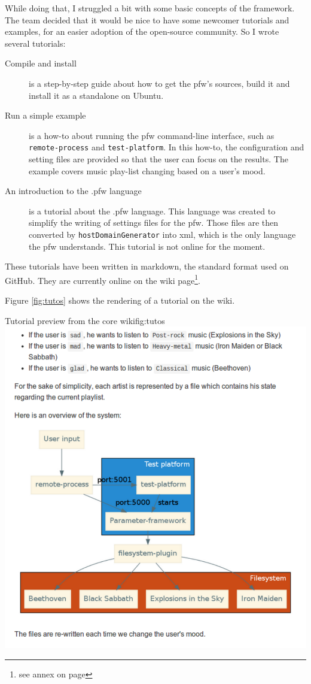 While doing that, I struggled a bit with some basic concepts of the framework. The
team decided that it would be nice to have some newcomer tutorials and examples,
for an easier adoption of the open-source community. So I wrote several
tutorials:
\begin{description}
    \item[Compile and install]
        is a step-by-step guide about how to get the \gls{pfw}'s sources,
        build it and install it as a standalone on Ubuntu.
    \item[Run a simple example]
        is a how-to about running the \gls{pfw} command-line interface,
        such as \lstinline{remote-process} and \lstinline {test-platform}.  In
        this how-to, the configuration and setting files are provided so that
        the user can focus on the results. The example covers music play-list
        changing based on a user's mood.
    \item[An introduction to the .pfw language]\label{desc:pfw-language}
        is a tutorial about the .pfw language. This language was
        created to simplify the writing of settings files for the
        \gls{pfw}. Those files are then converted by \lstinline{hostDomainGenerator} into \gls{xml}, which is
        the only language the \gls{pfw} understands. This tutorial is not online for the moment.
\end{description}
These tutorials have been written in \gls{markdown}, the standard format used
on \gls{GitHub}.
They are currently online on the wiki page\footnote{see annex on page \pageref{chap:annex}}.

Figure \ref{fig:tutos} shows the rendering of a tutorial on the wiki.
\begin{figureGraphics}{Tutorial preview from the core wiki}{fig:tutos}
    \includegraphics[height=0.5\textheight]{./src/img/tutos.pdf}
\end{figureGraphics}

